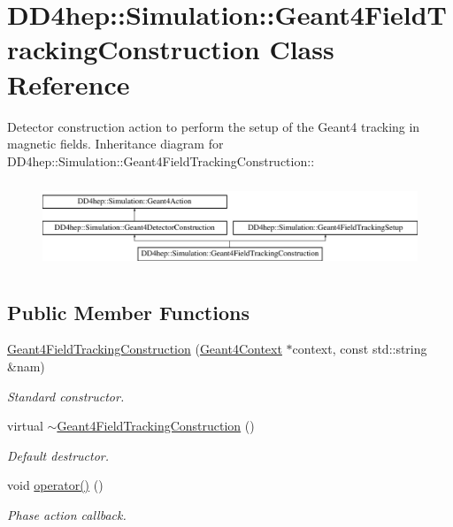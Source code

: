 \hypertarget{class_d_d4hep_1_1_simulation_1_1_geant4_field_tracking_construction}{
\section{DD4hep::Simulation::Geant4FieldTrackingConstruction Class Reference}
\label{class_d_d4hep_1_1_simulation_1_1_geant4_field_tracking_construction}
}


Detector construction action to perform the setup of the Geant4 tracking in magnetic fields.  
Inheritance diagram for DD4hep::Simulation::Geant4FieldTrackingConstruction::\begin{figure}[H]
\begin{center}
\leavevmode
\includegraphics[height=2.60062cm]{class_d_d4hep_1_1_simulation_1_1_geant4_field_tracking_construction}
\end{center}
\end{figure}
\subsection*{Public Member Functions}
\begin{DoxyCompactItemize}
\item 
\hyperlink{class_d_d4hep_1_1_simulation_1_1_geant4_field_tracking_construction_a30d46b332f2f91ec1f9923bc097812b3}{Geant4FieldTrackingConstruction} (\hyperlink{class_d_d4hep_1_1_simulation_1_1_geant4_context}{Geant4Context} $\ast$context, const std::string \&nam)
\begin{DoxyCompactList}\small\item\em Standard constructor. \item\end{DoxyCompactList}\item 
virtual \hyperlink{class_d_d4hep_1_1_simulation_1_1_geant4_field_tracking_construction_a3c5e7faf98ffa659094ac4f18dd5d1e2}{$\sim$Geant4FieldTrackingConstruction} ()
\begin{DoxyCompactList}\small\item\em Default destructor. \item\end{DoxyCompactList}\item 
void \hyperlink{class_d_d4hep_1_1_simulation_1_1_geant4_field_tracking_construction_adcd59c071e92490f8fd37423d74f542a}{operator()} ()
\begin{DoxyCompactList}\small\item\em Phase action callback. \item\end{DoxyCompactList}\end{DoxyCompactItemize}


